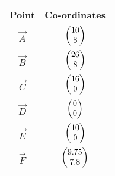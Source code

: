 \begin{tabular}{|c|c|}
\hline
Point & Co-ordinates\\
\hline
$\vec{A}$ & $\begin{pmatrix}10\\8\end{pmatrix}$\\
\hline
$\vec{B}$ & $\begin{pmatrix}26\\8\end{pmatrix}$\\
\hline
$\vec{C}$ & $\begin{pmatrix}16\\0\end{pmatrix}$\\
\hline
$\vec{D}$ & $\begin{pmatrix}0\\0\end{pmatrix}$\\
\hline
$\vec{E}$ & $\begin{pmatrix}10\\0\end{pmatrix}$\\
\hline
$\vec{F}$ & $\begin{pmatrix}9.75\\7.8\end{pmatrix}$\\
\hline
\end{tabular}
